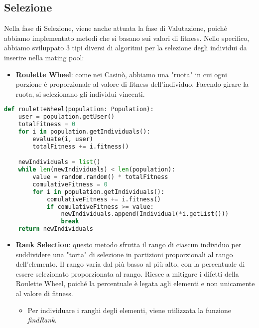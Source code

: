 \documentclass{article}
\begin{document}
\pagebreak

\subsection{Selezione}

Nella fase di Selezione, viene anche attuata la fase di Valutazione, poiché abbiamo implementato metodi che si basano sui valori di fitness. Nello specifico, abbiamo sviluppato 3 tipi diversi di algoritmi per la selezione degli individui da inserire nella mating pool:

\begin{itemize}
\item\textbf{Roulette Wheel}: come nei Casinò, abbiamo una "ruota" in cui ogni porzione è proporzionale al valore di fitness dell'individuo. Facendo girare la ruota, si selezionano gli individui vincenti.
\end{itemize}

\begin{lstlisting}[language=Python]
def rouletteWheel(population: Population):
    user = population.getUser()
    totalFitness = 0
    for i in population.getIndividuals():
        evaluate(i, user)
        totalFitness += i.fitness()

    newIndividuals = list()
    while len(newIndividuals) < len(population):
        value = random.random() * totalFitness
        comulativeFitness = 0
        for i in population.getIndividuals():
            comulativeFitness += i.fitness()
            if comulativeFitness >= value:
                newIndividuals.append(Individual(*i.getList()))
                break
    return newIndividuals
\end{lstlisting}

\begin{itemize}
\item\textbf{Rank Selection}: questo metodo sfrutta il rango di ciascun individuo per suddividere una "torta" di selezione in partizioni proporzionali al rango dell'elemento. Il rango varia dal più basso al più alto, con la percentuale di essere selezionato proporzionata al rango. Riesce a mitigare i difetti della Roulette Wheel, poiché la percentuale è legata agli elementi e non unicamente al valore di fitness.
\begin{itemize}
    \item Per individuare i ranghi degli elementi, viene utilizzata la funzione \textit{findRank}.
\end{itemize}

\end{itemize}
\end{document}
